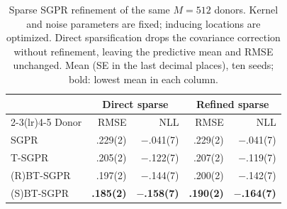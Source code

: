 \begin{table}[!ht]
\caption{Sparse SGPR refinement of the same \(M=512\) donors.
Kernel and noise parameters are fixed; inducing locations are optimized.
Direct sparsification drops the covariance correction without refinement,
leaving the predictive mean and RMSE unchanged.
Mean (SE in the last decimal places), ten seeds; bold: lowest mean in each column.}
\label{tab:kin40k-sgpr-refined}
\centering\footnotesize
\setlength{\tabcolsep}{3pt}
\begin{tabular}{@{}lrrrr@{}}
\toprule
& \multicolumn{2}{c}{Direct sparse} & \multicolumn{2}{c}{Refined sparse} \\
\cmidrule(lr){2-3}\cmidrule(lr){4-5}
Donor & RMSE & NLL & RMSE & NLL \\
\midrule
SGPR & .229(2) & $-$.041(7) & .229(2) & $-$.041(7) \\
T-SGPR & .205(2) & $-$.122(7) & .207(2) & $-$.119(7) \\
(R)BT-SGPR & .197(2) & $-$.144(7) & .200(2) & $-$.142(7) \\
(S)BT-SGPR & \textbf{.185(2)} & \textbf{$-$.158(7)} & \textbf{.190(2)} & \textbf{$-$.164(7)} \\
\bottomrule
\end{tabular}
\end{table}
